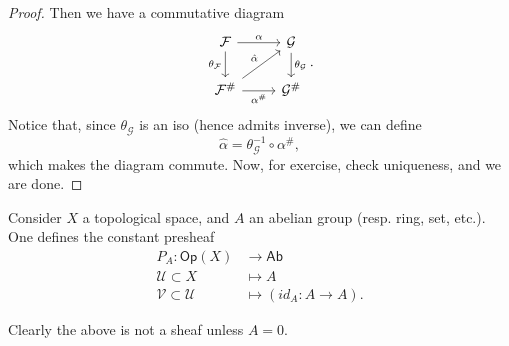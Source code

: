 \documentclass[../Main]{subfiles}
\begin{document}
\begin{proof}
Then we have a commutative diagram
\begin{equation}
\begin{tikzcd}
	\mathcal{F} \arrow[r, "\alpha", rightarrow] 
	\arrow[d, "\theta_{\mathcal{F}}"', rightarrow] &
	\mathcal{G} \arrow[d, "\theta_{\mathcal{G}}", rightarrow] \\
\mathcal{F}^\# \arrow[ru, "\hat{\alpha}", rightarrow] 
	\arrow[r, "\alpha^\#"', rightarrow] &
	\mathcal{G}^\#
\end{tikzcd}
.\end{equation} 
Notice that, since $\theta_{\mathcal{G}}$ is an iso (hence admits inverse),
we can define
\begin{equation}
	\hat{\alpha} = \theta_{\mathcal{G}}^{-1} \circ \alpha^\#
,\end{equation} 
which makes the diagram commute.
Now, for exercise, check uniqueness, and we are done.
\end{proof}

\begin{defn}
	Consider $X$ a topological space, and $A$ an abelian group
	(resp. ring, set, etc.).
	One defines the constant presheaf
	\begin{align}
		P_A: \mathsf{Op}(X) &\longrightarrow \mathsf{Ab} \\
		\mathcal{U} \subset X &\longmapsto A \nonumber \\
		\mathcal{V} \subset \mathcal{U} &\longmapsto (id_A\colon A \to A) \nonumber
	.\end{align} 
\end{defn}
\begin{rem}[]
	Clearly the above is not a sheaf unless $A = 0$.
\end{rem}
\end{document}
